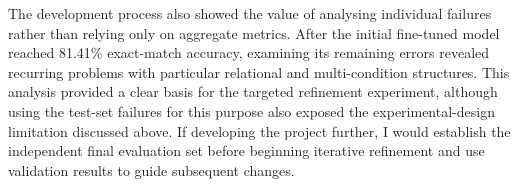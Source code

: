 \documentclass[11pt]{article} %
\theoremstyle{plain}
\theoremstyle{definition}
\begin{document}
The development process also showed the value of analysing individual
failures rather than relying only on aggregate metrics. After the initial
fine-tuned model reached 81.41\% exact-match accuracy, examining its
remaining errors revealed recurring problems with particular relational
and multi-condition structures. This analysis provided a clear basis for
the targeted refinement experiment, although using the test-set failures
for this purpose also exposed the experimental-design limitation
discussed above. If developing the project further, I would establish the
independent final evaluation set before beginning iterative refinement
and use validation results to guide subsequent changes.


\clearpage





\end{document}

